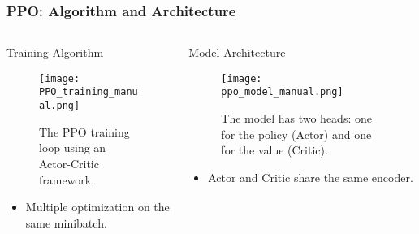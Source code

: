 \begin{frame}
    \frametitle{PPO: Algorithm and Architecture}

    \begin{columns}[T]
        \vspace{-1em}
        
        \begin{column}{0.5\textwidth}
            \begin{block}{Training Algorithm}
                \begin{figure}
                    \texttt{[image: PPO\_training\_manual.png]}
                    \caption{The PPO training loop using an Actor-Critic framework.}
                \end{figure}
                \vspace{-1.5em}
                \begin{itemize}
                    \item Multiple optimization on the same minibatch.
                \end{itemize}
            \end{block}
        \end{column}

        \begin{column}{0.5\textwidth}
            \begin{block}{Model Architecture}
                \begin{figure}
                    \texttt{[image: ppo\_model\_manual.png]}
                    \caption{The model has two heads: one for the policy (Actor) and one for the value (Critic).}
                \end{figure}
                \vspace{-1.5em}
                \begin{itemize}
                    \item Actor and Critic share the same encoder.
                \end{itemize}
            \end{block}
        \end{column}

    \end{columns}
\end{frame}

